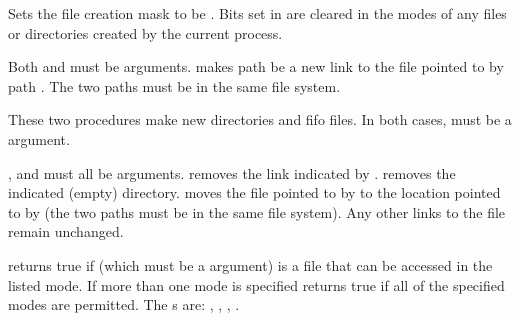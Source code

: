 \begin{protos}
\end{protos}
\noindent
Sets the file creation mask to be .
Bits set in  are cleared in the modes of any files or
 directories created by the current process.

\begin{protos}
\end{protos}
\noindent
Both  and  must be  arguments.
 makes path  be a new link to the file
 pointed to by path .
The two paths must be in the same file system.


\begin{protos}
\end{protos}
\noindent
These two procedures make new directories and fifo files.  In both
cases,  must be a  argument.


\begin{protos}
\end{protos}
\noindent
{},  and  must all be
 arguments.
 removes the link indicated by .
 removes the indicated (empty) directory.
 moves the file pointed to by  to the
 location pointed to by  (the two paths must be in
 the same file system).
Any other links to the file remain unchanged.


\begin{protos}
\end{protos}
\noindent
{} returns true if  (which must be a
 argument) is a file that
 can be accessed in the listed mode.
If more than one mode is specified  returns true
 if all of the specified modes are permitted.
The \/s are: , , ,
 .

